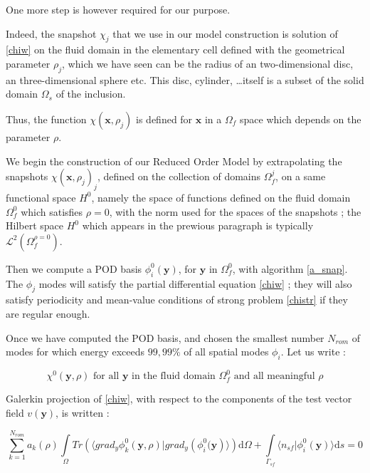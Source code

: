 One more step is however required for our purpose.

\par
Indeed, the snapshot $\chi_j$ that we use in our model construction is solution of \ref{chiw} on the fluid domain in %
the elementary cell defined with the geometrical parameter $\rho_j$, %
which we have seen can be the radius of an two-dimensional disc, an three-dimensional sphere etc. %
This disc, cylinder, \dots itself is a subset of the solid domain $\Omega_s$ of the inclusion.

\par
Thus, the function $\chi(\mathbf{x},\rho_j)$ is defined for $\mathbf{x}$ in a $\Omega_f$ space which depends on the parameter $\rho$.

\etoile
We begin the construction of our Reduced Order Model by extrapolating the snapshots $\chi(\mathbf{x},\rho_j)_j$, defined on the collection of domains $\Omega_f^j$, %
on a same functional space $H^0$, namely the space of functions defined on the fluid domain $\Omega_f^0$ which satisfies $\rho=0$, %
with the norm used for the spaces of the snapshots ; %
the Hilbert space $H^0$ which appears in the prewious paragraph is typically $\mathcal{L}^2\left(\Omega_f^{\rho=0}\right)$.

\par
Then we compute a POD basis $\phi_i^0(\mathbf{y})$, for $\mathbf{y}$ in $\Omega_f^0$, with algorithm \ref{a_snap}. %
The $\phi_j$ modes will satisfy the partial differential equation \ref{chiw} ; %
they will also satisfy periodicity and mean-value conditions of strong problem \ref{chistr} if they are regular enough.

\etoile
Once we have computed the POD basis, and chosen the smallest number $N_{rom}$ of modes for which energy exceeds $99,99\%$ of all spatial modes $\phi_i$. %
Let us write :

\[\chi^0\left(\mathbf{y},\rho\right)\text{ for all $\mathbf{y}$ in the fluid domain $\Omega_f^0$ and all meaningful $\rho$}\]

\par
Galerkin projection of \ref{chiw}, with respect to the components of the test vector field $v(\mathbf{y})$, is written :

\begin{equation}\label{morchiz}
\sum\limits_{k=1}^{N_{rom}} a_k(\rho)\int\limits_{\Omega}Tr\left(\langle grad_y\phi_k^0 \left(\mathbf{y},\rho\right)|grad_y\left(\phi_i^0(\mathbf{y}\right)\rangle\right)\text{d}\Omega+%
\int\limits_{\Gamma_{sf}}\langle n_{sf}|\phi_i^0(\mathbf{y})\rangle \text{d}s %
=0
\end{equation}


